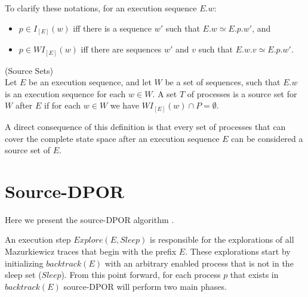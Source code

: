 To clarify these notations, for an execution sequence $E.w$:
\begin{itemize}
    \item  $p \in I_{[E]}(w)$ iff there is a sequence $w'$ such that $E.w \simeq E.p.w'$, and
    \item  $p \in WI_{[E]}(w)$ iff there are sequences $w'$ and $v$ such that $E.w.v \simeq E.p.w'$.
\end{itemize}

\begin{definition}{(Source Sets)}\label{def:Source Sets}\\
Let $E$ be an execution sequence,
and let $W$ be a set of sequences, such that $E.w$ is an execution
sequence for each $w \in W$. A set $T$ of processes is a source set for
$W$ after $E$ if for each $w \in W$ we have $WI_{[E]}(w) \cap P  = \emptyset$.
\end{definition}

A direct consequence of this definition is that every 
set of processes that can cover the complete state space after an execution sequence $E$
can be considered a source set of $E$.

\section{Source-DPOR}
Here we present the source-DPOR algorithm \cite{AbdullaAronisJohnssonSagonasDPOR2014}.

\begin{algorithm}
    \caption{Source-DPOR}
    \label{Source}
\end{algorithm}

An execution step $Explore(E, Sleep)$ is responsible for the explorations of all Mazurkiewicz traces 
that begin with the prefix $E$. These explorations start by initializing $backtrack(E)$ with an arbitrary enabled process
that is not in the sleep set ($Sleep$). From this point forward, for each process $p$ that exists in $backtrack(E)$
source-DPOR will perform two main phases.

